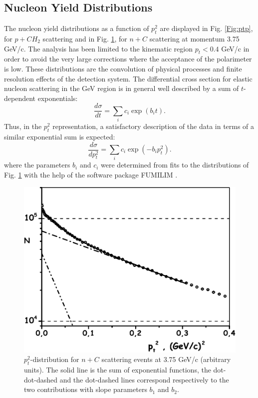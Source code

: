 \documentclass[twocolumn,epjc3]{svjour3}
\begin{document}
\subsection{Nucleon Yield Distributions}
The nucleon yield distributions as a function of $p_t^2$ are displayed in Fig. \ref{Fig:ptp}, for $p+CH_2$ scattering and in Fig. \ref{Fig:ptn}, for $n+C$ scattering at momentum 3.75 GeV/c.  The analysis has been limited to the kinematic region $p_t<0.4$ GeV/c in order to avoid the very large corrections where the acceptance of the polarimeter is low.  These distributions are the convolution of physical processes and finite resolution effects of the detection system.  The differential cross section for elastic nucleon scattering in the GeV region is in general well described by a sum of $t$-dependent exponentials:
$$\frac{d\sigma}{dt}=\sum_i c_i \exp(b_it). $$
Thus, in the $p_t^2$ representation, a satisfactory description of the data in terms of a similar exponential sum is expected:
$$\frac{d\sigma}{dp_t^2}=\sum_i c_i  \exp(-b_ip_t^2). $$
where the parameters $b_i$ and $c_i$ were determined from fits to the distributions of Fig. \ref{Fig:ptn} with the help of the software package FUMILIM \cite{Sitnik:2014zwa}.

\begin{figure}
  \centering
  \includegraphics[width=1.00\columnwidth]{fig14_nC_pt2.pdf}
  \caption{\small $p_t^2$-distribution for $n+C$ scattering events at 3.75 GeV/c (arbitrary units). The solid line is the sum of exponential functions, the dot-dot-dashed and the dot-dashed lines correspond respectively to the two contributions with slope parameters $b_1$ and $b_2$.}
  \label{Fig:ptn}
\end{figure}
\end{document}
